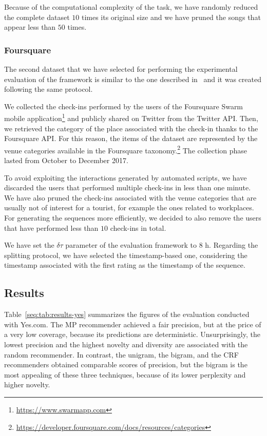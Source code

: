 Because of the computational complexity of the task, we have randomly reduced the complete dataset $10$ times its original size and we have pruned the songs that appear less than $50$ times.

\subsubsection{Foursquare}

The second dataset that we have selected for performing the experimental evaluation of the framework is similar to the one described in~\cite{Palumbo2017} and it was created following the same protocol.

We collected the check-ins performed by the users of the Foursquare Swarm mobile application\footnote{\url{https://www.swarmapp.com}} and publicly shared on Twitter from the Twitter API. Then, we retrieved the category of the place associated with the check-in thanks to the Foursquare API. For this reason, the items of the dataset are represented by the venue categories available in the Foursquare taxonomy.\footnote{\url{https://developer.foursquare.com/docs/resources/categories}} The collection phase lasted from October to December 2017.

To avoid exploiting the interactions generated by automated scripts, we have discarded the users that performed multiple check-ins in less than one minute. We have also pruned the check-ins associated with the venue categories that are usually not of interest for a tourist, for example the ones related to workplaces. For generating the sequences more efficiently, we decided to also remove the users that have performed less than $10$ check-ins in total.

We have set the $\delta \tau$ parameter of the evaluation framework to $8$ h. Regarding the splitting protocol, we have selected the timestamp-based one, considering the timestamp associated with the first rating as the timestamp of the sequence.

\subsection{Results}

Table~\ref{seq:tab:results-yes} summarizes the figures of the evaluation conducted with Yes.com. The MP recommender achieved a fair precision, but at the price of a very low coverage, because its predictions are deterministic.
Unsurprisingly, the lowest precision and the highest novelty and diversity are associated with the random recommender. In contrast, the unigram, the bigram, and the CRF recommenders obtained comparable scores of precision, but the bigram is the most appealing of these three techniques, because of its lower perplexity and higher novelty.

